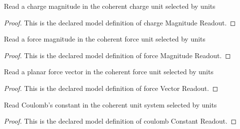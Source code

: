 \begin{definition}
  \label{def:physics:phyx-mini-0893:phyxminiproblems-problemphyxmini0893-chargemagnitudereadout}
  Read a charge magnitude in the coherent charge unit selected by units
\end{definition}
\begin{proof}
  This is the declared model definition of charge Magnitude Readout.
\end{proof}
\begin{definition}
  \label{def:physics:phyx-mini-0893:phyxminiproblems-problemphyxmini0893-forcemagnitudereadout}
  Read a force magnitude in the coherent force unit selected by units
\end{definition}
\begin{proof}
  This is the declared model definition of force Magnitude Readout.
\end{proof}
\begin{definition}
  \label{def:physics:phyx-mini-0893:phyxminiproblems-problemphyxmini0893-forcevectorreadout}
  Read a planar force vector in the coherent force unit selected by units
\end{definition}
\begin{proof}
  This is the declared model definition of force Vector Readout.
\end{proof}
\begin{definition}
  \label{def:physics:phyx-mini-0893:phyxminiproblems-problemphyxmini0893-coulombconstantreadout}
  Read Coulomb's constant in the coherent unit system selected by units
\end{definition}
\begin{proof}
  This is the declared model definition of coulomb Constant Readout.
\end{proof}
